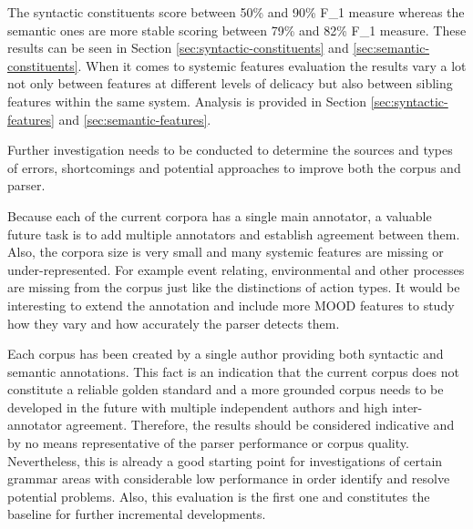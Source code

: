     The syntactic constituents score between 50\% and 90\% F_1 measure whereas the semantic ones are more stable scoring between 79\% and 82\% F_1 measure. These results can be seen in Section \ref{sec:syntactic-constituents} and \ref{sec:semantic-constituents}. When it comes to systemic features evaluation the results vary a lot not only between features at different levels of delicacy but also between sibling features within the same system. Analysis is provided in Section \ref{sec:syntactic-features} and \ref{sec:semantic-features}.

    Further investigation needs to be conducted to determine the sources and types of errors, shortcomings and potential approaches to improve both the corpus and parser. 

    Because each of the current corpora has a single main annotator, a valuable future task is to add multiple annotators and establish agreement between them. Also, the corpora size is very small and many systemic features are missing or under-represented. For example event relating, environmental and other processes are missing from the corpus just like the distinctions of action types. It would be interesting to extend the annotation and include more MOOD features to study how they vary and how accurately the parser detects them. 

    Each corpus has been created by a single author providing both syntactic and semantic annotations. This fact is an indication that the current corpus does not constitute a reliable golden standard and a more grounded corpus needs to be developed in the future with multiple independent authors and high inter-annotator agreement. Therefore, the results should be considered indicative and by no means representative of the parser performance or corpus quality. Nevertheless, this is already a good starting point for investigations of certain grammar areas with considerable low performance in order identify and resolve potential problems. Also, this evaluation is the first one and constitutes the baseline for further incremental developments.